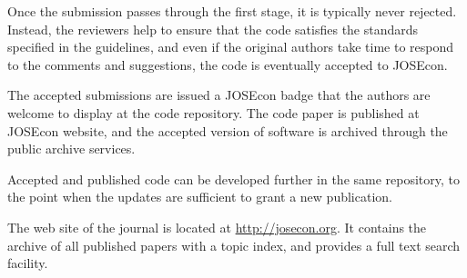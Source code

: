 Once the submission passes through the first stage, it is typically never rejected.  Instead,
the reviewers help to ensure that the code satisfies the standards specified in the guidelines,
and even if the original authors take time to respond to the comments and suggestions, the 
code is eventually accepted to JOSEcon.

The accepted submissions are issued a JOSEcon badge that the authors are welcome 
to display at the code repository.
The code paper is published at JOSEcon website, and the accepted version of software is 
archived through the public archive services.

Accepted and published code can be developed further in the same repository, to the point
when the updates are sufficient to grant a new publication.

The web site of the journal is located at \url{http://josecon.org}. It contains the archive 
of all published papers with a topic index, and provides a full text search facility.

